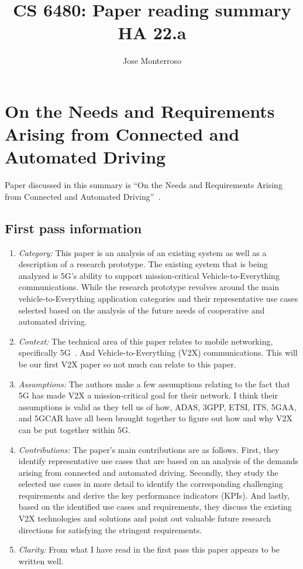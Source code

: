 \documentclass[letterpaper,twocolumn,10pt]{article}
\title{CS 6480: Paper reading summary\\
HA 22.a\\}
\author{Jose Monterroso}
\affil{School of Computing, University of Utah}
\begin{document}
\maketitle
\section{On the Needs and Requirements Arising from Connected and Automated Driving}

Paper discussed in this summary is ``On the Needs and Requirements Arising from Connected and Automated Driving''~\cite{ontheneeds}.

\subsection{First pass information}
\label{sec:first}
\begin{enumerate}

\item {\it Category:} 
This paper is an analysis of an existing system as well as a description of a research prototype. The existing system
that is being analyzed is 5G's ability to support mission-critical Vehicle-to-Everything communications. While the research
prototype revolves around the main vehicle-to-Everything application categories and their representative use cases selected
based on the analysis of the future needs of cooperative and automated driving. 

\item {\it Context:} 
The technical area of this paper relates to mobile networking, specifically 5G~\cite{5gwhite}. And Vehicle-to-Everything (V2X)
communications. This will be our first V2X paper so not much can relate to this paper.

\item {\it Assumptions:}  
The authors make a few assumptions relating to the fact that 5G has made V2X a mission-critical goal for their network.
I think their assumptions is valid as they tell us of how, ADAS, 3GPP, ETSI, ITS, 5GAA, and 5GCAR have all been brought
together to figure out how and why V2X can be put together within 5G.

\item {\it Contributions:} 
The paper's main contributions are as follows. First, they identify representative use cases that are based on an 
analysis of the demands arising from connected and automated driving. Secondly, they study the selected use cases in 
more detail to identify the corresponding challenging requirements and derive the key performance indicators (KPIs). And 
lastly, based on the identified use cases and requirements, they discuss the existing V2X technologies and solutions and
point out valuable future research directions for satisfying the stringent requirements. 

\item {\it Clarity:}
From what I have read in the first pass this paper appears to be written well.

\end{enumerate}
\end{document}
